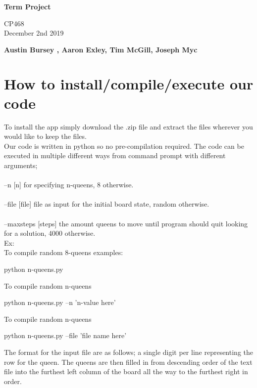 \documentclass{article}
\begin{document}
\begin{titlepage}
  \pagestyle{fancy}
  \thispagestyle{fancy}
   \begin{center}
       \vspace*{1cm}
 
      \Huge
       \textbf{Term Project}
 
       \vspace{0.5cm}
       \Large
        CP468 \\ December 2nd 2019
 
       \vspace{1.5cm}
 
       \textbf{Austin Bursey , Aaron Exley, Tim McGill, Joseph Myc}
 
       \vfill

       \vspace{0.8cm}
 
   \end{center}
\end{titlepage}
\setcounter{page}{2}

\section{How to install/compile/execute our code}
To install the app simply download the .zip file and extract the files wherever you would like to keep the files.
\\
Our code is written in python so no pre-compilation required.
The code can be executed in multiple different ways from command prompt with different arguments;\\
\\
--n [n] for specifying n-queens, 8 otherwise.\\
\\
--file [file] file as input for the initial board state, random otherwise.\\
\\
--maxsteps [steps] the amount queens to move until program should quit looking for a solution, 4000 otherwise. \\

Ex:
\\
To compile random 8-queens examples: 
\begin{center}
python n-queens.py
\end{center}
To compile random n-queens
\begin{center}
python n-queens.py --n 'n-value here'
\end{center}
To compile random n-queens
\begin{center}
python n-queens.py --file 'file name here'
\end{center}
The format for the input file are as follows; a single digit per line representing the row for the queen. The queens are then filled in from descending order of the text file into the furthest left column of the board all the way to the furthest right in order. 
\end{document}
